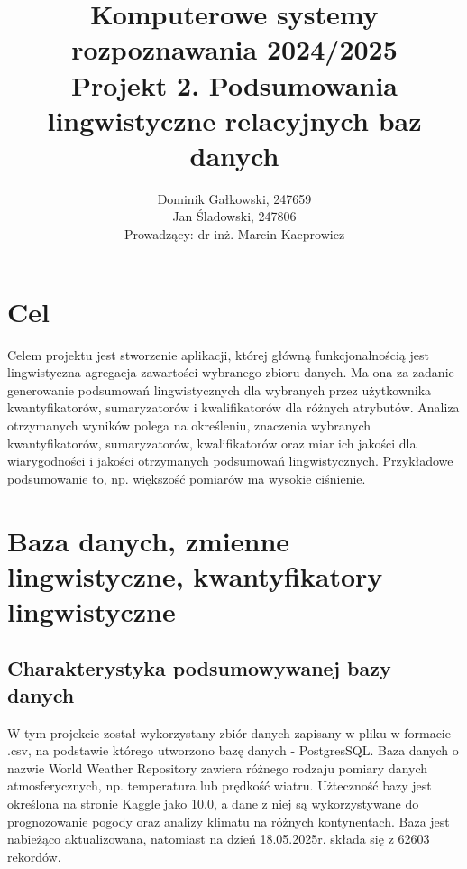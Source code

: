 \documentclass{article}
\author{
	{Dominik Gałkowski, 247659} \\
	{Jan Śladowski, 247806}\\ 
{Prowadzący: dr inż. Marcin Kacprowicz}
}
\title{Komputerowe systemy rozpoznawania 2024/2025\\Projekt 2. Podsumowania lingwistyczne relacyjnych baz danych}
\begin{document}
\maketitle 

\section{Cel}
Celem projektu jest stworzenie aplikacji, której główną funkcjonalnością
jest lingwistyczna agregacja zawartości wybranego zbioru danych. Ma ona za zadanie generowanie podsumowań lingwistycznych dla wybranych przez użytkownika kwantyfikatorów, sumaryzatorów i kwalifikatorów dla różnych atrybutów. Analiza otrzymanych wyników polega na określeniu, znaczenia wybranych kwantyfikatorów, sumaryzatorów, kwalifikatorów oraz miar ich jakości dla wiarygodności i jakości otrzymanych podsumowań lingwistycznych. Przykładowe podsumowanie to, np. większość pomiarów ma wysokie ciśnienie.


\section{Baza danych, zmienne lingwistyczne, kwantyfikatory lingwistyczne}

\subsection{Charakterystyka podsumowywanej bazy danych}
W tym projekcie został wykorzystany zbiór danych zapisany w pliku w formacie .csv, na podstawie którego utworzono bazę danych - PostgresSQL. Baza danych o nazwie World Weather Repository zawiera różnego rodzaju pomiary danych atmosferycznych, np. temperatura lub prędkość wiatru. \cite{baza} Użteczność bazy jest określona na stronie Kaggle jako 10.0, a dane z niej są wykorzystywane do prognozowanie pogody oraz analizy klimatu na różnych kontynentach. Baza jest nabieżąco aktualizowana, natomiast na dzień 18.05.2025r. składa się z 62603 rekordów. 
\end{document}
